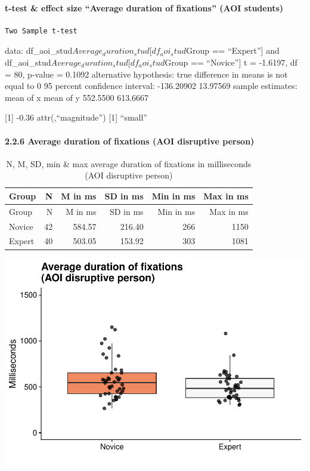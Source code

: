 \documentclass[
]{article}
\begin{document}
\paragraph{t-test \& effect size ``Average duration of fixations'' (AOI
students)}\label{t-test-effect-size-average-duration-of-fixations-aoi-students}

\begin{verbatim}
Two Sample t-test
\end{verbatim}

data: df\_aoi\_stud\(Average_duration_stud[df_aoi_stud\)Group ==
``Expert''{]} and
df\_aoi\_stud\(Average_duration_stud[df_aoi_stud\)Group == ``Novice''{]}
t = -1.6197, df = 80, p-value = 0.1092 alternative hypothesis: true
difference in means is not equal to 0 95 percent confidence interval:
-136.20902 13.97569 sample estimates: mean of x mean of y 552.5500
613.6667

{[}1{]} -0.36 attr(,``magnitude'') {[}1{]} ``small''

\paragraph{2.2.6 Average duration of fixations (AOI disruptive
person)}\label{average-duration-of-fixations-aoi-disruptive-person}

\begin{longtable}[]{@{}lrrrrr@{}}
\caption{N, M, SD, min \& max average duration of fixations in
milliseconds (AOI disruptive person)}\tabularnewline
\toprule\noalign{}
Group & N & M in ms & SD in ms & Min in ms & Max in ms \\
\midrule\noalign{}
\endfirsthead
\toprule\noalign{}
Group & N & M in ms & SD in ms & Min in ms & Max in ms \\
\midrule\noalign{}
\endhead
\bottomrule\noalign{}
\endlastfoot
Novice & 42 & 584.57 & 216.40 & 266 & 1150 \\
Expert & 40 & 503.05 & 153.92 & 303 & 1081 \\
\end{longtable}

\includegraphics{expertise_2024_09_26_no_outlierdetection_MK_files/figure-latex/dur_disrup-1.pdf}
\end{document}
